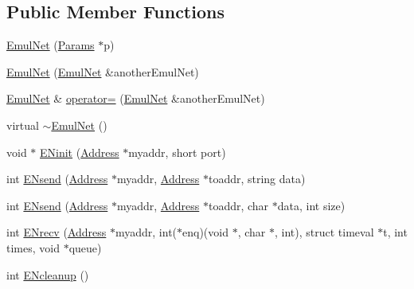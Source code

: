 \subsection*{Public Member Functions}
\begin{DoxyCompactItemize}
\item 
\hyperlink{class_emul_net_aa47ba47cbe2bf26bec96cfeaa0f6bbc9}{Emul\+Net} (\hyperlink{class_params}{Params} $\ast$p)
\item 
\hyperlink{class_emul_net_aec6f273238a0b975b79a9902f135f996}{Emul\+Net} (\hyperlink{class_emul_net}{Emul\+Net} \&another\+Emul\+Net)
\item 
\hyperlink{class_emul_net}{Emul\+Net} \& \hyperlink{class_emul_net_a62f34d25dc41fc3e07393a606905a0e2}{operator=} (\hyperlink{class_emul_net}{Emul\+Net} \&another\+Emul\+Net)
\item 
virtual \hyperlink{class_emul_net_aa8f1312e33ed1593753054651636798e}{$\sim$\+Emul\+Net} ()
\item 
void $\ast$ \hyperlink{class_emul_net_aea9b348d4fef905c7975ddabc65a64cb}{E\+Ninit} (\hyperlink{class_address}{Address} $\ast$myaddr, short port)
\item 
int \hyperlink{class_emul_net_aa02db2ae1e9d846f682b036284c479a5}{E\+Nsend} (\hyperlink{class_address}{Address} $\ast$myaddr, \hyperlink{class_address}{Address} $\ast$toaddr, string data)
\item 
int \hyperlink{class_emul_net_a25ce00454279129ac52cc21f7afb2c43}{E\+Nsend} (\hyperlink{class_address}{Address} $\ast$myaddr, \hyperlink{class_address}{Address} $\ast$toaddr, char $\ast$data, int size)
\item 
int \hyperlink{class_emul_net_a4584812b7ed2bb20cd7ab8b29bf2f05f}{E\+Nrecv} (\hyperlink{class_address}{Address} $\ast$myaddr, int($\ast$enq)(void $\ast$, char $\ast$, int), struct timeval $\ast$t, int times, void $\ast$queue)
\item 
int \hyperlink{class_emul_net_a5bf56d688164a30bb49cb444f1bbe2ea}{E\+Ncleanup} ()
\end{DoxyCompactItemize}
